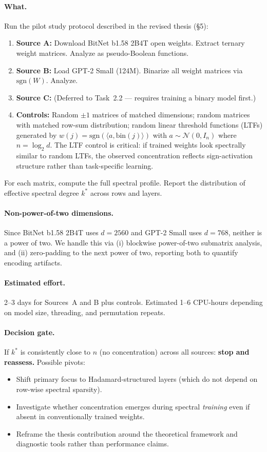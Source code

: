 \documentclass[12pt,a4paper]{article}
\begin{document}
\paragraph{What.} Run the pilot study protocol described in the revised thesis (\S5):
\begin{enumerate}
    \item \textbf{Source A:} Download BitNet b1.58 2B4T open weights. Extract ternary weight matrices. Analyze as pseudo-Boolean functions.
    \item \textbf{Source B:} Load GPT-2 Small (124M). Binarize all weight matrices via $\text{sgn}(W)$. Analyze.
    \item \textbf{Source C:} (Deferred to Task~2.2 --- requires training a binary model first.)
    \item \textbf{Controls:} Random $\pm 1$ matrices of matched dimensions; random matrices with matched row-sum distribution; random linear threshold functions (LTFs) generated by $w(j) = \text{sgn}(\langle a, \text{bin}(j)\rangle)$ with $a \sim \mathcal{N}(0, I_n)$ where $n = \log_2 d$. The LTF control is critical: if trained weights look spectrally similar to random LTFs, the observed concentration reflects sign-activation structure rather than task-specific learning.
\end{enumerate}

For each matrix, compute the full spectral profile. Report the distribution of effective spectral degree $k^*$ across rows and layers.

\paragraph{Non-power-of-two dimensions.} Since BitNet b1.58 2B4T uses $d=2560$ and GPT-2 Small uses $d=768$, neither is a power of two. We handle this via (i) blockwise power-of-two submatrix analysis, and (ii) zero-padding to the next power of two, reporting both to quantify encoding artifacts.

\paragraph{Estimated effort.} 2--3 days for Sources~A and B plus controls. Estimated 1--6 CPU-hours depending on model size, threading, and permutation repeats.

\paragraph{Decision gate.} If $k^*$ is consistently close to $n$ (no concentration) across all sources: \textbf{stop and reassess.} Possible pivots:
\begin{itemize}
    \item Shift primary focus to Hadamard-structured layers (which do not depend on row-wise spectral sparsity).
    \item Investigate whether concentration emerges during spectral \emph{training} even if absent in conventionally trained weights.
    \item Reframe the thesis contribution around the theoretical framework and diagnostic tools rather than performance claims.
\end{itemize}
\end{document}
